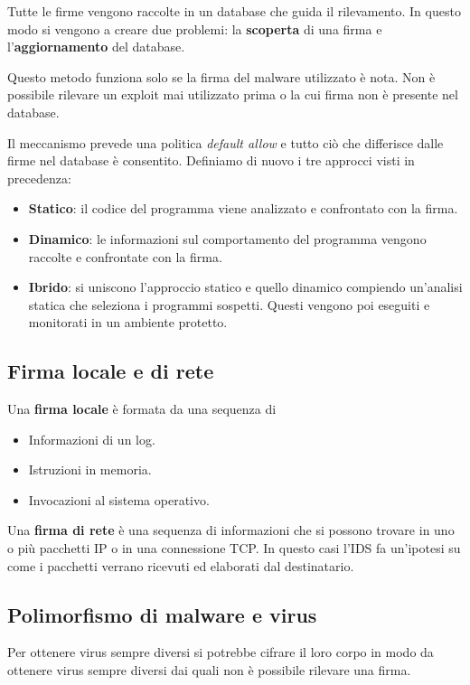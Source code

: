 Tutte le firme vengono raccolte in un database che guida il rilevamento. In questo modo si vengono a creare due
problemi: la \textbf{scoperta} di una firma e l'\textbf{aggiornamento} del database.

Questo metodo funziona solo se la firma del malware utilizzato è nota. Non è possibile rilevare un exploit mai
utilizzato prima o la cui firma non è presente nel database.

Il meccanismo prevede una politica \emph{default allow} e tutto ciò che differisce dalle firme nel database è
consentito. Definiamo di nuovo i tre approcci visti in precedenza:
\begin{itemize}
	\item \textbf{Statico}: il codice del programma viene analizzato e confrontato con la firma.
	\item \textbf{Dinamico}: le informazioni sul comportamento del programma vengono raccolte e confrontate con la
	      firma.
	\item \textbf{Ibrido}: si uniscono l'approccio statico e quello dinamico compiendo un'analisi statica che seleziona
	      i programmi sospetti. Questi vengono poi eseguiti e monitorati in un ambiente protetto.
\end{itemize}

\subsection{Firma locale e di rete}
Una \textbf{firma locale} è formata da una sequenza di
\begin{itemize}
	\item Informazioni di un log.
	\item Istruzioni in memoria.
	\item Invocazioni al sistema operativo.
\end{itemize}

Una \textbf{firma di rete} è una sequenza di informazioni che si possono trovare in uno o più pacchetti IP o in una
connessione TCP. In questo casi l'IDS fa un'ipotesi su come i pacchetti verrano ricevuti ed elaborati dal destinatario.

\subsection{Polimorfismo di malware e virus}
Per ottenere virus sempre diversi si potrebbe cifrare il loro corpo in modo da ottenere virus sempre diversi dai quali
non è possibile rilevare una firma.

